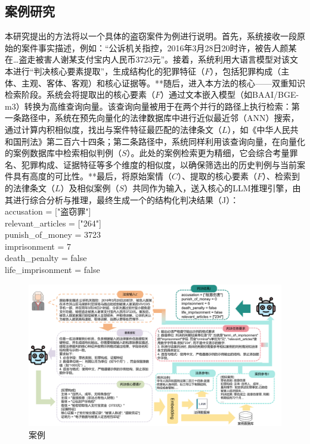 \subsection{\heiti 案例研究}
本研究提出的方法将以一个具体的盗窃案件为例进行说明。首先，系统接收一段原始的案件事实描述，例如：“公诉机关指控，2016年3月28日20时许，被告人颜某在…盗走被害人谢某支付宝内人民币3723元”。接着，系统利用大语言模型对该文本进行“判决核心要素提取”，生成结构化的犯罪特征（$F$），包括犯罪构成（主体、主观、客体、客观）和核心证据等。**随后，进入本方法的核心——双重知识检索阶段。系统会将提取出的核心要素（$F$）通过文本嵌入模型（如BAAI/BGE-m3）转换为高维查询向量。该查询向量被用于在两个并行的路径上执行检索：第一条路径中，系统在预先向量化的法律数据库中进行近似最近邻（ANN）搜索，通过计算内积相似度，找出与案件特征最匹配的法律条文（$L$），如《中华人民共和国刑法》第二百六十四条；第二条路径中，系统同样利用该查询向量，在向量化的案例数据库中检索相似判例（$S$）。此处的案例检索更为精细，它会综合考量罪名、犯罪构成、证据特征等多个维度的相似度，以确保筛选出的历史判例与当前案件具有高度的可比性。**最后，将原始案情（$C$）、提取的核心要素（$F$）、检索到的法律条文（$L$）及相似案例（$S$）共同作为输入，送入核心的LLM推理引擎，由其进行综合分析与推理，最终生成一个的结构化判决结果（J）：
\\
accusation = ["盗窃罪"]
\\
relevant\_articles = ["264"]
\\
punish\_of\_money = 3723
\\
imprisonment = 7
\\
death\_penalty = false
\\
life\_imprisonment = false

\begin{figure}[htpb]
    \centering
    \includegraphics[width=1\linewidth]{fig/case.pdf}
    \caption{案例}
    \label{fig:case}
\end{figure}